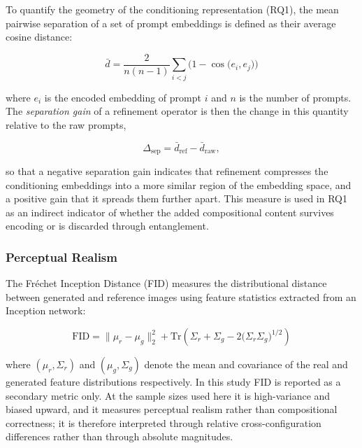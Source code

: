 \documentclass[a4paper,twoside,12pt]{report}
\begin{document}
To quantify the geometry of the conditioning representation (RQ1), the mean
pairwise separation of a set of prompt embeddings is defined as their average
cosine distance:

\begin{equation}
\bar{d}
= \frac{2}{n(n-1)} \sum_{i < j}
  \Big(1 - \cos\!\big(e_i, e_j\big)\Big)
\label{eq:separation}
\end{equation}

where \(e_i\) is the encoded embedding of prompt \(i\) and \(n\) is the number
of prompts. The \emph{separation gain} of a refinement operator is then the
change in this quantity relative to the raw prompts,

\begin{equation}
\Delta_{\mathrm{sep}} = \bar{d}_{\mathrm{ref}} - \bar{d}_{\mathrm{raw}},
\end{equation}

so that a negative separation gain indicates that refinement compresses the
conditioning embeddings into a more similar region of the embedding space, and a
positive gain that it spreads them further apart. This measure is used in RQ1 as
an indirect indicator of whether the added compositional content survives
encoding or is discarded through entanglement.

\subsubsection{Perceptual Realism}

The Fr\'echet Inception Distance (FID) measures the distributional distance
between generated and reference images using feature statistics extracted from
an Inception network:

\begin{equation}
\mathrm{FID}
= \lVert \mu_r - \mu_g \rVert_2^2
+ \mathrm{Tr}\!\left(
  \Sigma_r + \Sigma_g - 2\big(\Sigma_r \Sigma_g\big)^{1/2}
\right)
\label{eq:fid}
\end{equation}

where \((\mu_r, \Sigma_r)\) and \((\mu_g, \Sigma_g)\) denote the mean and
covariance of the real and generated feature distributions respectively. In this
study FID is reported as a secondary metric only. At the sample sizes used here
it is high-variance and biased upward, and it measures perceptual realism rather
than compositional correctness; it is therefore interpreted through relative
cross-configuration differences rather than through absolute magnitudes.
\end{document}
